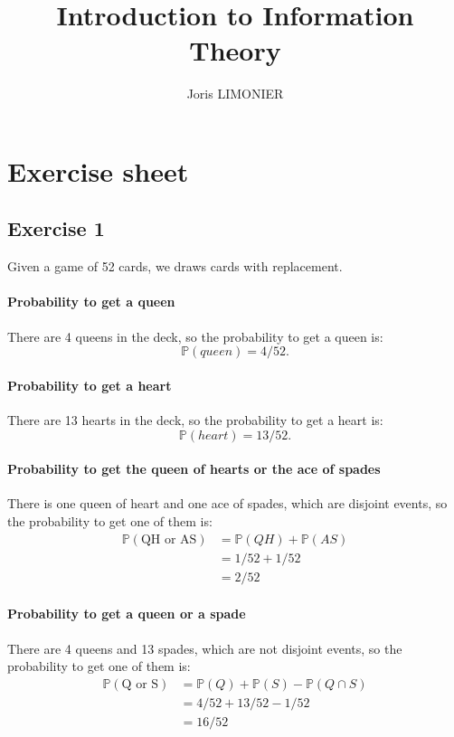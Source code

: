 \documentclass{article}
\title{Introduction to Information Theory}
\author{Joris LIMONIER}
\newcommand{\1}{\mathbf{1}}
\renewcommand{\P}{\mathbb{P}}
\begin{document}
\maketitle

\tableofcontents

\section{Exercise sheet}
\subsection{Exercise 1}
Given a game of 52 cards, we draws cards with replacement.

\paragraph{Probability to get a queen}
There are 4 queens in the deck, so the probability to get a queen is:
$$\P(queen) = 4/52.$$

\paragraph{Probability to get a heart}
There are 13 hearts in the deck, so the probability to get a heart is:
$$\P(heart) = 13/52.$$

\paragraph{Probability to get the queen of hearts or the ace of spades}
There is one queen of heart and one ace of spades, which are disjoint events, so the probability to get one of them is:
\begin{align*}
  \P(\text{QH or AS}) & = \P(QH) + \P(AS) \\
                      & = 1/52 + 1/52     \\
                      & = 2/52
\end{align*}

\paragraph{Probability to get a queen or a spade}
There are 4 queens and 13 spades, which are not disjoint events, so the probability to get one of them is:
\begin{align*}
  \P(\text{Q or S}) & = \P(Q) + \P(S) - \P(Q \cap S) \\
                    & = 4/52 + 13/52 - 1/52          \\
                    & = 16/52
\end{align*}
\end{document}
